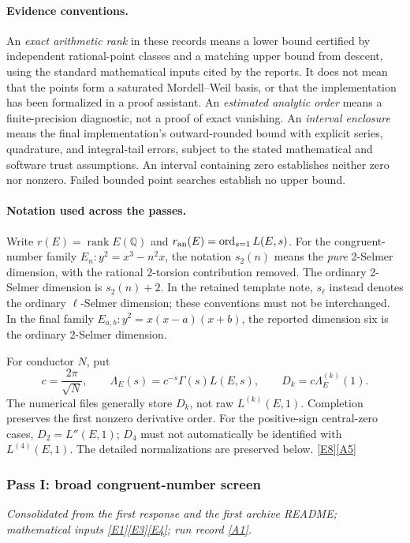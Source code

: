 \documentclass[11pt]{article}
\newcommand{\srcref}[1]{\hyperlink{source:#1}{[#1]}}
\begin{document}
\paragraph{Evidence conventions.}
An \emph{exact arithmetic rank} in these records means a lower bound certified
by independent rational-point classes and a matching upper bound from descent,
using the standard mathematical inputs cited by the reports. It does not mean
that the points form a saturated Mordell--Weil basis, or that the implementation
has been formalized in a proof assistant. An \emph{estimated analytic order}
means a finite-precision diagnostic, not a proof of exact vanishing. An
\emph{interval enclosure} means the final implementation's outward-rounded
bound with explicit series, quadrature, and integral-tail errors, subject to
the stated mathematical and software trust assumptions. An interval containing
zero establishes neither zero nor nonzero. Failed bounded point searches
establish no upper bound.

\paragraph{Notation used across the passes.}
Write $r(E)=\operatorname{rank}E(\mathbb Q)$ and
$r_{\rm an}(E)=\operatorname{ord}_{s=1}L(E,s)$.
For the congruent-number family $E_n:y^2=x^3-n^2x$, the notation $s_2(n)$
means the \emph{pure} 2-Selmer dimension, with the rational 2-torsion contribution
removed. The ordinary 2-Selmer dimension is $s_2(n)+2$.
In the retained template note, $s_\ell$ instead denotes the ordinary
$\ell$-Selmer dimension; these conventions must not be interchanged.
In the final family $E_{a,b}:y^2=x(x-a)(x+b)$, the reported dimension six
is the ordinary 2-Selmer dimension.

For conductor $N$, put
\[
 c=\frac{2\pi}{\sqrt N},\qquad
 \Lambda_E(s)=c^{-s}\Gamma(s)L(E,s),\qquad
 D_k=c\Lambda_E^{(k)}(1).
\]
The numerical files generally store $D_k$, not raw $L^{(k)}(E,1)$.
Completion preserves the first nonzero derivative order. For the positive-sign
central-zero cases, $D_2=L''(E,1)$; $D_4$ must not automatically be identified
with $L^{(4)}(E,1)$. The detailed normalizations are preserved below.
\srcref{E8}\srcref{A5}

\subsubsection{Pass I: broad congruent-number screen}\label{pass1}
\textit{Consolidated from the first response and the first archive README; mathematical inputs \srcref{E1}\srcref{E3}\srcref{E4}; run record \srcref{A1}.}
\end{document}
